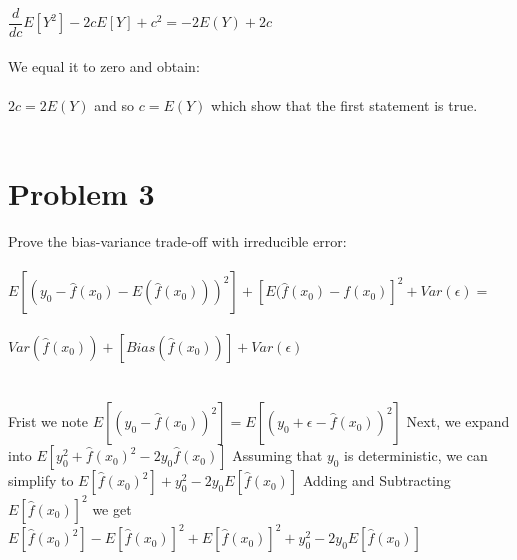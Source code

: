 \documentclass[11pt,a4paper,twoside,openright]{report}
\begin{document}
	 
	$ \dfrac{d}{dc}E[Y^2] - 2cE[Y] + c^2 = -2E(Y) + 2c $ \\\\
	
	We equal it to zero and obtain:\\\\
	
	$2c = 2E(Y)$ and so $c = E(Y)$ which show that the first statement is true. \\\\
	
	
	\section*{Problem 3}
	
	Prove the bias-variance trade-off with irreducible error:\\\\
	
	
	
	$E[(y_{0} - \hat{f}(x_{0}) - E(\hat{f}(x_{0})))^2] + [E(\hat{f}(x_{0}) - f(x_{0})]^2 + Var(\epsilon) =$\\\\
	
	$Var(\hat{f}(x_{0})) + [Bias(\hat{f}(x_{0}))] + Var(\epsilon)$\\
	\\\\
	
  	Frist we note $E[(y_{0} - \hat{f}(x_{0}))^2] = E[(y_{0} + \epsilon - \hat{f}(x_{0}))^2]$ 
	Next, we expand into $E[y_{0}^2 + \hat{f}(x_{0})^2 - 2y_{0}\hat{f}(x_{0})]$
  	Assuming that $y_{0}$ is deterministic, we can simplify to $E[\hat{f}(x_{0})^2] + y_{0}^2 - 2y_{0}E[\hat{f}(x_{0})]$
	Adding and Subtracting $E[\hat{f}(x_{0})]^2$ we get
	$E[\hat{f}(x_{0})^2] - E[\hat{f}(x_{0})]^2 + E[\hat{f}(x_{0})]^2 + y_{0}^2 - 2y_{0}E[\hat{f}(x_{0})] $
	
	
	
	
	
	
	
	
	
	
	
	
	
	
	
	
	
	
	
	
	
\end{document}
